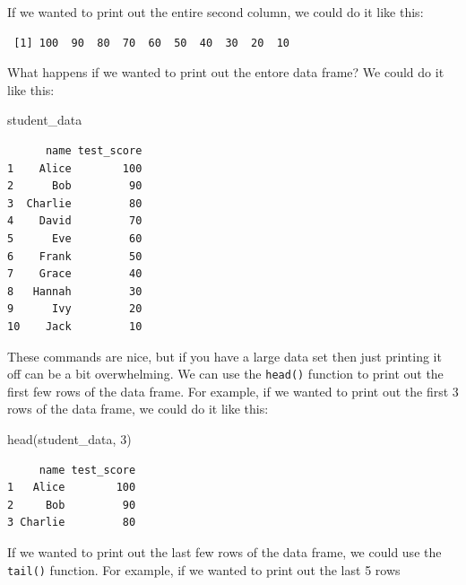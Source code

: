 \documentclass[
  letterpaper,
  DIV=11,
  numbers=noendperiod]{scrreprt}
\newenvironment{Shaded}{\begin{snugshade}}{\end{snugshade}}
\newcommand{\DecValTok}[1]{\textcolor[rgb]{0.68,0.00,0.00}{#1}}
\newcommand{\FunctionTok}[1]{\textcolor[rgb]{0.28,0.35,0.67}{#1}}
\newcommand{\NormalTok}[1]{\textcolor[rgb]{0.00,0.23,0.31}{#1}}
\newcommand{\SpecialCharTok}[1]{\textcolor[rgb]{0.37,0.37,0.37}{#1}}
\begin{document}
If we wanted to print out the entire second column, we could do it like
this:

\begin{Shaded}
\end{Shaded}

\begin{verbatim}
 [1] 100  90  80  70  60  50  40  30  20  10
\end{verbatim}

What happens if we wanted to print out the entore data frame? We could
do it like this:

\begin{Shaded}
\begin{Highlighting}[]
\NormalTok{student\_data}
\end{Highlighting}
\end{Shaded}

\begin{verbatim}
      name test_score
1    Alice        100
2      Bob         90
3  Charlie         80
4    David         70
5      Eve         60
6    Frank         50
7    Grace         40
8   Hannah         30
9      Ivy         20
10    Jack         10
\end{verbatim}

These commands are nice, but if you have a large data set then just
printing it off can be a bit overwhelming. We can use the
\texttt{head()} function to print out the first few rows of the data
frame. For example, if we wanted to print out the first 3 rows of the
data frame, we could do it like this:

\begin{Shaded}
\begin{Highlighting}[]
\FunctionTok{head}\NormalTok{(student\_data, }\DecValTok{3}\NormalTok{)}
\end{Highlighting}
\end{Shaded}

\begin{verbatim}
     name test_score
1   Alice        100
2     Bob         90
3 Charlie         80
\end{verbatim}

If we wanted to print out the last few rows of the data frame, we could
use the \texttt{tail()} function. For example, if we wanted to print out
the last 5 rows
\end{document}
